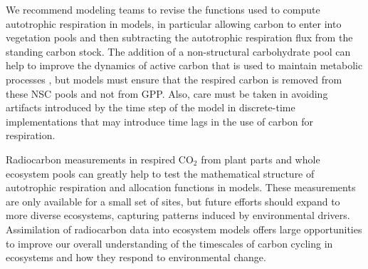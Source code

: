 \documentclass[bg, manuscript]{copernicus}
\begin{document}
We recommend modeling teams to revise the functions used to compute autotrophic respiration in models, in particular allowing carbon to enter into vegetation pools and then subtracting the autotrophic respiration flux from the standing carbon stock. The addition of a non-structural carbohydrate pool can help to improve the dynamics of active carbon that is used to maintain metabolic processes \citep{Herrera2020}, but models must ensure that the respired carbon is removed from these NSC pools and not from GPP. Also,
care must be taken in avoiding artifacts introduced by the time step of the model in discrete-time implementations that may introduce time lags in the use of carbon for respiration. 

Radiocarbon measurements in respired CO$_2$ from plant parts and whole ecosystem pools can greatly help to test the mathematical structure of autotrophic respiration and allocation functions in models. These measurements are only available for a small set of sites, but future efforts should expand to more diverse ecosystems, capturing patterns induced by environmental drivers.  Assimilation of radiocarbon data into ecosystem models offers large opportunities to improve our overall understanding of the timescales of carbon cycling in ecosystems and how they respond to environmental change. 













%
%
%
\end{document}
